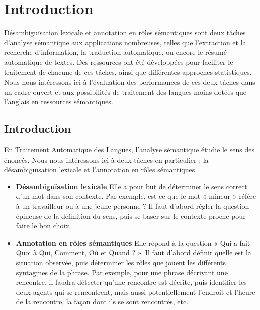 \chapter{Introduction}
\label{ch:intro}

Désambiguïsation lexicale et annotation en rôles sémantiques sont deux tâches
d'analyse sémantique aux applications nombreuses, telles que l'extraction et la
recherche d'information, la traduction automatique, ou encore le résumé
automatique de textes. Des ressources ont été développées pour faciliter le
traitement de chacune de ces tâches, ainsi que différentes approches
statistiques. Nous nous intéressons ici à l'évaluation des performances de ces deux tâches dans un cadre ouvert et aux possibilités de traitement des langues moins dotées que l'anglais en ressources sémantiques.

\section{Introduction}


En Traitement Automatique des Langues, l'analyse sémantique étudie le sens des
énoncés. Nous nous intéressons ici à deux tâches en particulier : la
désambiguïsation lexicale et l'annotation en rôles sémantiques.

\begin{itemize}

  \item \textbf{Désambiguïsation lexicale} Elle a pour but de déterminer le
      sens correct d'un mot dans son contexte. Par exemple, est-ce que le mot «
      mineur » réfère à un travailleur ou à une jeune personne ? Il faut
      d'abord régler la question épineuse de la définition du sens, puis se
      baser sur le contexte proche pour faire le bon choix.

  \item \textbf{Annotation en rôles sémantiques} Elle répond à la question «
      Qui a fait Quoi à Qui, Comment, Où et Quand ? ». Il faut d'abord définir
      quelle est la situation observée, puis déterminer les rôles que jouent
      les différents syntagmes de la phrase. Par exemple, pour une phrase
      décrivant une rencontre, il faudra détecter qu'une rencontre est décrite,
      puis identifier les deux agents qui se rencontrent, mais aussi
      potentiellement l'endroit et l'heure de la rencontre, la façon dont ils
      se sont rencontrés, etc.

\end{itemize}

